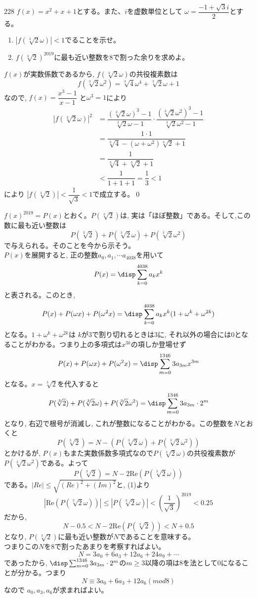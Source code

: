 \begin{thm}{228}{}{}
 $f(x)=x^2+x+1$とする。また、$i$を虚数単位として $\omega=\dfrac{-1+\sqrt{3}i}{2}$とする。
 \begin{enumerate}
  \item $\left|f\left(\sqrt[3]{2}\omega\right)\right|<1$でることを示せ。
  \item $f\left(\sqrt[3]{2}\right)^{2019}$に最も近い整数を8で割った余りを求めよ。
 \end{enumerate}
\end{thm}

$f(x)$が実数係数であるから, $f(\sqrt[3]{2}\omega )$の共役複素数は
\[f(\sqrt[3]{2}\omega^2)=\sqrt[3]{4}\omega^4 +\sqrt[3]{2}\omega +1\]
なので, $f(x)=\dfrac{x^3-1}{x-1}$ と$\omega^3=1$により
\begin{align*}
\left|f\left(\sqrt[3]{2}\omega\right)\right|^2&=\dfrac{(\sqrt[3]{2}\omega)^3-1}{\sqrt[3]{2}\omega-1}\cdot \dfrac{(\sqrt[3]{2}\omega^2)^3-1}{\sqrt[3]{2}\omega^2-1}\\
&=\dfrac{1\cdot 1}{\sqrt[3]{4}-(\omega +\omega^2)\sqrt[3]{2} +1}\\
&= \dfrac{1}{\sqrt[3]{4}+\sqrt[3]{2}+1}\\
&< \dfrac{1}{1+1+1}=\dfrac{1}{3} <1
\end{align*}
により $|f(\sqrt[3]{2})|<\dfrac{1}{\sqrt{3}}<1$で成立する。\qed

$f(x)^{2019}=P(x)$とおく。$P(\sqrt[3]{2})$は, 実は「ほぼ整数」である。そして,この数に最も近い整数は
\[P(\sqrt[3]{2})+P(\sqrt[3]{2}\omega)+P(\sqrt[3]{2}\omega^2)\]
で与えられる。そのことを今から示そう。\\
$P(x)$を展開すると, 正の整数$a_0,a_1,\cdots a_{4038}$を用いて
\[P(x)=\disp\sum_{k=0}^{4038}a_kx^k\]
と表される。このとき,
\[P(x)+P(\omega x)+P(\omega^2 x)=\disp\sum_{k=0}^{4038}a_kx^k(1+\omega^k+\omega^{2k})\]
となる。$1+\omega^k +\omega^{2k}$は $k$が$3$で割り切れるときは$3$に, それ以外の場合には$0$となることがわかる。つまり上の多項式は$x^{3k}$の項しか登場せず
\[P(x)+P(\omega x)+P(\omega^2 x)=\disp\sum_{m=0}^{1346}3a_{3m}x^{3m}\]
となる。$x=\sqrt[3]{2}$を代入すると
\[P(\sqrt[3]{2})+P(\sqrt[3]{2}\omega )+P(\sqrt[3]{2}\omega^2)=\disp\sum_{m=0}^{1346}3a_{3m}\cdot 2^m\]
となり, 右辺で根号が消滅し, これが整数になることがわかる。この整数を$N$とおくと
\[P(\sqrt[3]{2})=N-(P(\sqrt[3]{2}\omega)+P(\sqrt[3]{2}\omega^2))\]
とかけるが, $P(x)$もまた実数係数多項式なので$P(\sqrt[3]{2}\omega )$の共役複素数が$P(\sqrt[3]{2}\omega^2)$である。よって
\[P(\sqrt[3]{2})=N-2\mbox{Re}(P(\sqrt[3]{2}\omega))\]
である。$|Re|\leq \sqrt{(Re)^2+(Im)^2}$と, (1)より
\[|\mbox{Re}(P(\sqrt[3]{2}\omega))|\leq |P(\sqrt[3]{2}\omega)|<\left(\dfrac{1}{\sqrt{3}}\right)^{2019}<0.25\]
だから, 
\[N-0.5<N-2\mbox{Re}(P(\sqrt[3]{2}))<N+0.5\]
となり, $P(\sqrt[3]{2})$に最も近い整数が$N$であることを意味する。\\
つまりこの$N$を8で割ったあまりを考察すればよい。
\[N=3a_0+6a_3+12a_6+24a_9+\cdots\]
であったから, $\disp\sum_{m=0}^{1346}3a_{3m}\cdot 2^m$の$m\geq 3$以降の項は8を法として0になることが分かる。つまり
\[N\equiv 3a_0+6a_3+12a_6　(mod 8)\]
なので $a_0,a_3,a_6$が求まればよい。

